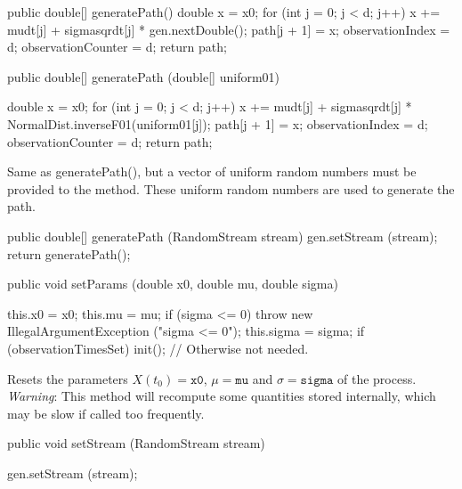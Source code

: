 \begin{code}\begin{hide}

   public double[] generatePath() {
        double x = x0;
        for (int j = 0; j < d; j++) {
            x += mudt[j] + sigmasqrdt[j] * gen.nextDouble();
            path[j + 1] = x;
        }
        observationIndex   = d;
        observationCounter = d;
        return path;
    }\end{hide}

   public double[] generatePath (double[] uniform01) \begin{hide} {
        double x = x0;
        for (int j = 0; j < d; j++) {
            x += mudt[j] + sigmasqrdt[j] * NormalDist.inverseF01(uniform01[j]);
            path[j + 1] = x;
        }
        observationIndex   = d;
        observationCounter = d;
        return path;
    }\end{hide}
\end{code}
\begin{tabb} Same as generatePath(), but a vector of uniform random numbers
must be provided to the method.  These uniform random numbers are used
to generate the path.
\end{tabb}
\begin{code}\begin{hide}

   public double[] generatePath (RandomStream stream) {
        gen.setStream (stream);
        return generatePath();
    }\end{hide}

   public void setParams (double x0, double mu, double sigma) \begin{hide} {
        this.x0    = x0;
        this.mu    = mu;
        if (sigma <= 0)
           throw new IllegalArgumentException ("sigma <= 0");
        this.sigma = sigma;
        if (observationTimesSet) init(); // Otherwise not needed.
    }\end{hide}
\end{code}
\begin{tabb}
Resets the parameters $X(t_{0}) = \texttt{x0}$, $\mu = \texttt{mu}$ and
$\sigma = \texttt{sigma}$ of the process.
\emph{Warning}: This method will recompute some quantities stored internally,
which may be slow if called too frequently.
\end{tabb}
\begin{code}

   public void setStream (RandomStream stream) \begin{hide} { gen.setStream (stream); }\end{hide}
\end{code}
